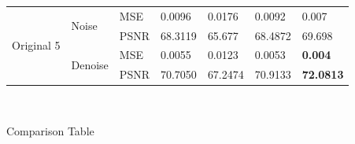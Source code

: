 \begin{center}
\begin{tabular}{llllllllllll|l|l|l|l|l|l|l|l|l|l|l|l|l|}
\multicolumn{4}{|l|}{\multirow{4}{*}{Original 5}} & \multicolumn{4}{l|}{\multirow{2}{*}{Noise}}   & \multicolumn{4}{l|}{MSE}  & \multicolumn{3}{l|}{0.0096}  & \multicolumn{3}{l|}{0.0176}           & \multicolumn{4}{l|}{0.0092}   & \multicolumn{3}{l|}{0.007}            \\ \cline{9-25} 
\multicolumn{4}{|l|}{}                            & \multicolumn{4}{l|}{}                         & \multicolumn{4}{l|}{PSNR} & \multicolumn{3}{l|}{68.3119} & \multicolumn{3}{l|}{65.677}           & \multicolumn{4}{l|}{68.4872}  & \multicolumn{3}{l|}{69.698}           \\ \cline{5-25} 
\multicolumn{4}{|l|}{}                            & \multicolumn{4}{l|}{\multirow{2}{*}{Denoise}} & \multicolumn{4}{l|}{MSE}  & \multicolumn{3}{l|}{0.0055}  & \multicolumn{3}{l|}{0.0123}           & \multicolumn{4}{l|}{0.0053}   & \multicolumn{3}{l|}{\textbf{0.004}}   \\ \cline{9-25} 
\multicolumn{4}{|l|}{}                            & \multicolumn{4}{l|}{}                         & \multicolumn{4}{l|}{PSNR} & \multicolumn{3}{l|}{70.7050} & \multicolumn{3}{l|}{67.2474}          & \multicolumn{4}{l|}{70.9133}  & \multicolumn{3}{l|}{\textbf{72.0813}} \\ \hline
\end{tabular}
	
	\
	
	Comparison Table
\end{center}

\newpage
